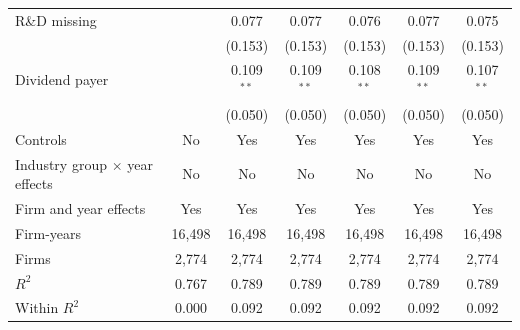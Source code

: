 \begin{tabular}{lcccccc}
R\&D missing &  & 0.077 & 0.077 & 0.076 & 0.077 & 0.075 \\
 &  & (0.153) & (0.153) & (0.153) & (0.153) & (0.153) \\
Dividend payer &  & 0.109$^{**}$ & 0.109$^{**}$ & 0.108$^{**}$ & 0.109$^{**}$ & 0.107$^{**}$ \\
 &  & (0.050) & (0.050) & (0.050) & (0.050) & (0.050) \\
\midrule
Controls & No & Yes & Yes & Yes & Yes & Yes \\
Industry group $\times$ year effects & No & No & No & No & No & No \\
Firm and year effects & Yes & Yes & Yes & Yes & Yes & Yes \\
Firm-years & 16,498 & 16,498 & 16,498 & 16,498 & 16,498 & 16,498 \\
Firms & 2,774 & 2,774 & 2,774 & 2,774 & 2,774 & 2,774 \\
$R^2$ & 0.767 & 0.789 & 0.789 & 0.789 & 0.789 & 0.789 \\
Within $R^2$ & 0.000 & 0.092 & 0.092 & 0.092 & 0.092 & 0.092 \\
\bottomrule
\end{tabular}
